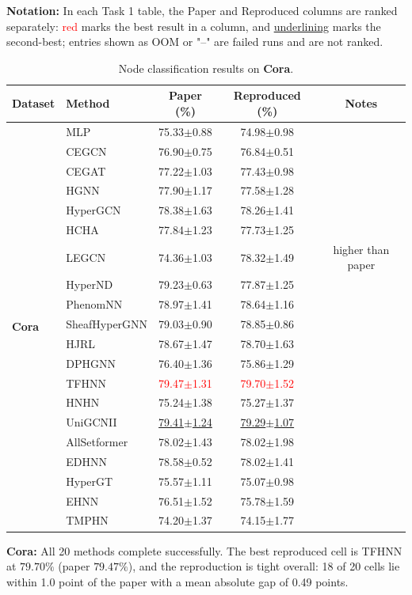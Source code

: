 \documentclass[11pt,a4paper]{article}
\begin{document}
\noindent\textbf{Notation:} In each Task 1 table, the Paper and Reproduced columns are ranked separately: \textcolor{red}{red} marks the best result in a column, and \underline{underlining} marks the second-best; entries shown as OOM or "--" are failed runs and are not ranked.
\begin{table}[H]
	\centering\small
	\begin{tabular}{llccc}
		\toprule
		Dataset & Method & Paper (\%) & Reproduced (\%) & Notes \\
		\midrule
		\multirow{20}{*}{\textbf{Cora}} & MLP               & 75.33$\pm$0.88   & 74.98$\pm$0.98   &  \\
		 & CEGCN             & 76.90$\pm$0.75   & 76.84$\pm$0.51   &  \\
		 & CEGAT             & 77.22$\pm$1.03   & 77.43$\pm$0.98   &  \\
		 & HGNN              & 77.90$\pm$1.17   & 77.58$\pm$1.28   &  \\
		 & HyperGCN          & 78.38$\pm$1.63   & 78.26$\pm$1.41   &  \\
		 & HCHA              & 77.84$\pm$1.23   & 77.73$\pm$1.25   &  \\
		 & LEGCN             & 74.36$\pm$1.03   & 78.32$\pm$1.49   & higher than paper \\
		 & HyperND           & 79.23$\pm$0.63   & 77.87$\pm$1.25   &  \\
		 & PhenomNN          & 78.97$\pm$1.41   & 78.64$\pm$1.16   &  \\
		 & SheafHyperGNN     & 79.03$\pm$0.90   & 78.85$\pm$0.86   &  \\
		 & HJRL              & 78.67$\pm$1.47   & 78.70$\pm$1.63   &  \\
		 & DPHGNN            & 76.40$\pm$1.36   & 75.86$\pm$1.29   &  \\
		 & TFHNN             & \textcolor{red}{79.47$\pm$1.31}   & \textcolor{red}{79.70$\pm$1.52}   &  \\
		 & HNHN              & 75.24$\pm$1.38   & 75.27$\pm$1.37   &  \\
		 & UniGCNII          & \underline{79.41$\pm$1.24}   & \underline{79.29$\pm$1.07}   &  \\
		 & AllSetformer      & 78.02$\pm$1.43   & 78.02$\pm$1.98   &  \\
		 & EDHNN             & 78.58$\pm$0.52   & 78.02$\pm$1.41   &  \\
		 & HyperGT           & 75.57$\pm$1.11   & 75.07$\pm$0.98   &  \\
		 & EHNN              & 76.51$\pm$1.52   & 75.78$\pm$1.59   &  \\
		 & TMPHN             & 74.20$\pm$1.37   & 74.15$\pm$1.77   &  \\
		\bottomrule
	\end{tabular}
	\caption{Node classification results on \textbf{Cora}.}
\end{table}
\par\smallskip
\noindent\textbf{Cora:} All 20 methods complete successfully. The best reproduced cell is TFHNN at $79.70\%$ (paper $79.47\%$), and the reproduction is tight overall: 18 of 20 cells lie within 1.0 point of the paper with a mean absolute gap of 0.49 points.
\end{document}
